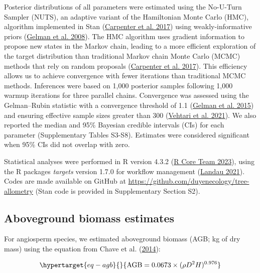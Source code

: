 \documentclass[
  12pt,
  letterpaper,
  DIV=11,
  numbers=noendperiod]{scrartcl}
\begin{document}
Posterior distributions of all parameters were estimated using the
No-U-Turn Sampler (NUTS), an adaptive variant of the Hamiltonian Monte
Carlo (HMC), algorithm implemented in Stan
(\protect\hyperlink{ref-Carpenter2017}{Carpenter et al. 2017}) using
weakly-informative priors (\protect\hyperlink{ref-Gelman2008}{Gelman et
al. 2008}). The HMC algorithm uses gradient information to propose new
states in the Markov chain, leading to a more efficient exploration of
the target distribution than traditional Markov chain Monte Carlo (MCMC)
methods that rely on random proposals
(\protect\hyperlink{ref-Carpenter2017}{Carpenter et al. 2017}). This
efficiency allows us to achieve convergence with fewer iterations than
traditional MCMC methods. Inferences were based on 1,000 posterior
samples following 1,000 warmup iterations for three parallel chains.
Convergence was assessed using the Gelman--Rubin statistic with a
convergence threshold of 1.1 (\protect\hyperlink{ref-Gelman2013}{Gelman
et al. 2015}) and ensuring effective sample sizes greater than 300
(\protect\hyperlink{ref-Vehtari2021}{Vehtari et al. 2021}). We also
reported the median and 95\% Bayesian credible intervals (CIs) for each
parameter (Supplementary Tables S3-S8). Estimates were considered
significant when 95\% CIs did not overlap with zero.

Statistical analyses were performed in R version 4.3.2
(\protect\hyperlink{ref-RCoreTeam2023}{R Core Team 2023}), using the R
packages \emph{targets} version 1.7.0 for workflow management
(\protect\hyperlink{ref-Landau2021}{Landau 2021}). Codes are made
available on GitHub at
\url{https://github.com/duyenecology/tree-allometry} (Stan code is
provided in Supplementary Section S2).

\hypertarget{aboveground-biomass-estimates}{%
\subsection{Aboveground biomass
estimates}\label{aboveground-biomass-estimates}}

For angiosperm species, we estimated aboveground biomass (AGB; kg of dry
mass) using the equation from Chave et al.
(\protect\hyperlink{ref-Chave2014}{2014}):

\begin{equation}\protect\hypertarget{eq-agb}{}{
\mathrm{AGB} = 0.0673 \times (\rho D^2H)^{0.976}
}\label{eq-agb}\end{equation}
\end{document}
